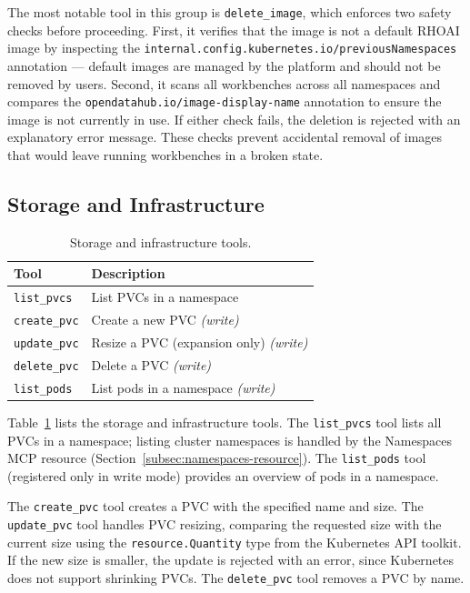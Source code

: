 \documentclass[
  digital,     %
  oneside,     %
  nosansbold,  %
  nocolorbold, %
  lof,         %
  lot,         %
]{fithesis4}
\begin{document}
The most notable tool in this group is \texttt{delete\_image}, which
enforces two safety checks before proceeding. First, it verifies that
the image is not a default RHOAI image by inspecting the
\texttt{internal.config.kubernetes.io/\allowbreak previousNamespaces} annotation ---
default images are managed by the platform and should not be removed by
users. Second, it scans all workbenches across all namespaces and
compares the \texttt{opendatahub.io/\allowbreak image-display-name} annotation to
ensure the image is not currently in use. If either check fails, the
deletion is rejected with an explanatory error message. These checks prevent accidental removal of images that would leave
running workbenches in a broken state.

\subsection{Storage and Infrastructure}
\label{subsec:storage-tools}

\begin{table}[!htbp]
\caption{Storage and infrastructure tools.}
\label{tab:tools-storage}
\small
\begin{tabularx}{\textwidth}{lX}
\toprule
\textbf{Tool} & \textbf{Description} \\
\midrule
\texttt{list\_pvcs}       & List PVCs in a namespace \\
\texttt{create\_pvc}      & Create a new PVC \textit{(write)} \\
\texttt{update\_pvc}      & Resize a PVC (expansion only) \textit{(write)} \\
\texttt{delete\_pvc}      & Delete a PVC \textit{(write)} \\
\texttt{list\_pods}       & List pods in a namespace \textit{(write)} \\
\bottomrule
\end{tabularx}
\end{table}

Table~\ref{tab:tools-storage} lists the storage and infrastructure tools.
The \texttt{list\_pvcs} tool lists all PVCs in a namespace; listing
cluster namespaces is handled by the Namespaces MCP resource
(Section~\ref{subsec:namespaces-resource}). The \texttt{list\_pods} tool
(registered only in write mode) provides an overview of pods in a namespace.

The \texttt{create\_pvc} tool creates a PVC with the specified name and
size. The \texttt{update\_pvc} tool handles PVC
resizing, comparing the requested size with the current size using the
\texttt{resource.Quantity} type from the Kubernetes API toolkit. If the
new size is smaller, the update is rejected with an error, since
Kubernetes does not support shrinking PVCs. The \texttt{delete\_pvc} tool
removes a PVC by name.
\end{document}
